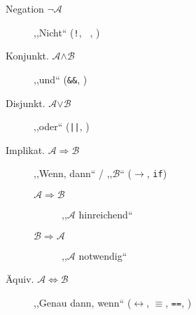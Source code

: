 \begin{description}
  \item [Negation
        $\boldsymbol{\neg} \mathcal{A}$]
        ,,Nicht``
        (\texttt{!}, \texttt{~},
        )

  \item [Konjunkt.
        $\mathcal{A} \boldsymbol{\land} \mathcal{B}$]
        ,,und``
        (\texttt{&&},
        )

  \item [Disjunkt.
        $\mathcal{A} \boldsymbol{\lor} \mathcal{B}$]
        ,,oder``
        (\texttt{||},
        )

  \item [Implikat.
        $\mathcal{A} \boldsymbol{\Rightarrow} \mathcal{B}$]
        ,,Wenn, dann`` / \linebreak ,,$\mathcal{B}$``
        ($\rightarrow$, \texttt{if})
        \begin{description}
          \item [$\mathcal{A} \Rightarrow \mathcal{B}$] ,,$\mathcal{A}$ hinreichend``
          \item [$\mathcal{B} \Rightarrow \mathcal{A}$] ,,$\mathcal{A}$ notwendig``
        \end{description}

  \item [Äquiv.
        $\mathcal{A} \boldsymbol{\Leftrightarrow} \mathcal{B}$]
        ,,Genau dann, wenn``
        ($\leftrightarrow$, $\equiv$,
        \texttt{==},
        )
\end{description}

